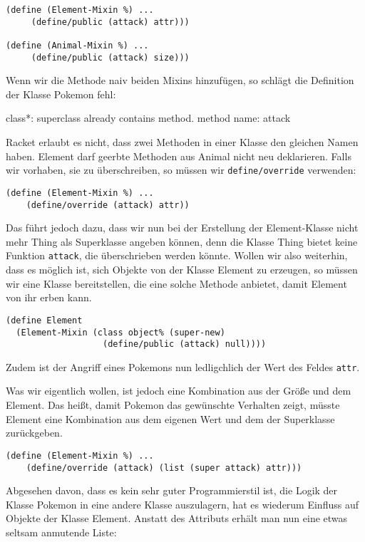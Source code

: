 \begin{lstlisting}
(define (Element-Mixin %) ...
     (define/public (attack) attr)))

(define (Animal-Mixin %) ...
     (define/public (attack) size)))
\end{lstlisting}

Wenn wir die Methode naiv beiden Mixins hinzufügen, so schlägt die Definition der Klasse Pokemon fehl:

{\rerror class*: superclass already contains method. method name: attack}

Racket erlaubt es nicht, dass zwei Methoden in einer Klasse den gleichen Namen haben. Element darf geerbte Methoden aus Animal nicht neu deklarieren. Falls wir vorhaben, sie zu überschreiben, so müssen wir \texttt{define/override} verwenden:

\begin{lstlisting}
(define (Element-Mixin %) ...
    (define/override (attack) attr))
\end{lstlisting}


Das führt jedoch dazu, dass wir nun bei der Erstellung der Element-Klasse nicht mehr Thing als Superklasse angeben können, denn die Klasse Thing bietet keine Funktion \texttt{attack}, die überschrieben werden könnte. Wollen wir also weiterhin, dass es möglich ist, sich Objekte von der Klasse Element zu erzeugen, so müssen wir eine Klasse bereitstellen, die eine solche Methode anbietet, damit Element von ihr erben kann.

\begin{lstlisting}
(define Element 
  (Element-Mixin (class object% (super-new)
                   (define/public (attack) null))))
\end{lstlisting}

Zudem ist der Angriff eines Pokemons nun ledligchlich der Wert des Feldes \texttt{attr}. 

Was wir eigentlich wollen, ist jedoch eine Kombination aus der Größe und dem Element. Das heißt, damit Pokemon das gewünschte Verhalten zeigt, müsste Element eine Kombination aus dem eigenen Wert und dem der Superklasse zurückgeben.

\begin{lstlisting}
(define (Element-Mixin %) ...
    (define/override (attack) (list (super attack) attr)))
\end{lstlisting}

Abgesehen davon, dass es kein sehr guter Programmierstil ist, die Logik der Klasse Pokemon in eine andere Klasse auszulagern, hat es wiederum Einfluss auf Objekte der Klasse Element. Anstatt des Attributs erhält man nun eine etwas seltsam anmutende Liste:

